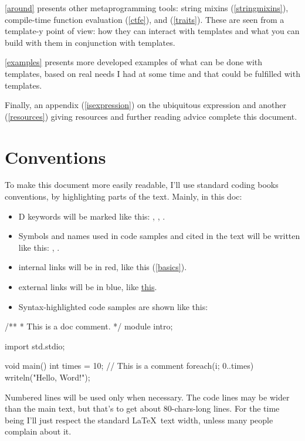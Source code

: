 \autoref{around} presents other meta\-pro\-gram\-ming tools: string mixins (\ref{stringmixins}), compile-time function evaluation (\ref{ctfe}), and  (\ref{traits}). These are seen from a \mbox{template-y} point of view: how they can interact with templates and what you can build with them in conjunction with templates.

\autoref{examples} presents more developed examples of what can be done with templates, based on real needs I had at some time and that could be fulfilled with templates.

Finally, an appendix (\autoref{isexpression}) on the ubiquitous  expression  and another (\ref{resources}) giving resources and further reading advice complete this document.

\section*{Conventions}\label{conventions}

To make this document more easily readable, I'll use standard coding books conventions, by highlighting parts of the text. Mainly, in this doc:

\begin{itemize}
\item D keywords will be marked like this: , , .
\item Symbols and names used in code samples and cited in the text will be written like this: , .
\item internal links will be in red, like this (\ref{basics}).
\item external links will be in blue, like \href{http://www.dlang.org}{this}.
\item Syntax-highlighted code samples are shown like this:
\end{itemize}

\begin{ndcode}
/**
 * This is a doc comment.
 */
module intro;

import std.stdio;

void main()
{
    int times = 10;
    // This is a comment
    foreach(i; 0..times) 
        writeln("Hello, Word!");
}
\end{ndcode}

Numbered lines will be used only when necessary. The code lines may be wider than the main text, but that's to get about 80-chars-long lines. For the time being I'll just respect the standard \LaTeX\ text width, unless many people complain about it.

